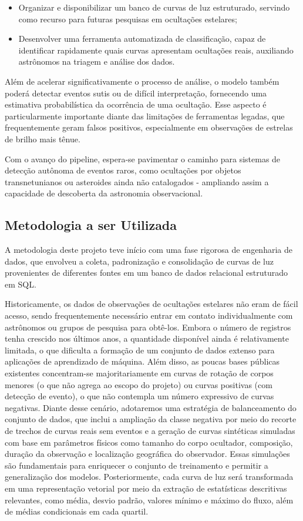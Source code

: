 \documentclass[12pt]{article}
\numberwithin{equation}{section}
\begin{document}
\begin{itemize}
    \item Organizar e disponibilizar um banco de curvas de luz estruturado, servindo como recurso para futuras pesquisas em ocultações estelares;
    \item Desenvolver uma ferramenta automatizada de classificação, capaz de identificar rapidamente quais curvas apresentam ocultações reais, auxiliando astrônomos na triagem e análise dos dados.
\end{itemize}

Além de acelerar significativamente o processo de análise, o modelo também poderá detectar eventos sutis ou de difícil interpretação, fornecendo uma estimativa probabilística da ocorrência de uma ocultação. Esse aspecto é particularmente importante diante das limitações de ferramentas legadas, que frequentemente geram falsos positivos, especialmente em observações de estrelas de brilho mais tênue.

Com o avanço do pipeline, espera-se pavimentar o caminho para sistemas de detecção autônoma de eventos raros, como ocultações por objetos transnetunianos ou asteroides ainda não catalogados - ampliando assim a capacidade de descoberta da astronomia observacional.

\subsection{Metodologia a ser Utilizada}
\indent
A metodologia deste projeto teve início com uma fase rigorosa de engenharia de dados, que envolveu a coleta, padronização e consolidação de curvas de luz provenientes de diferentes fontes em um banco de dados relacional estruturado em SQL. 

Historicamente, os dados de observações de ocultações estelares não eram de fácil acesso, sendo frequentemente necessário entrar em contato individualmente com astrônomos ou grupos de pesquisa para obtê-los. Embora o número de registros tenha crescido nos últimos anos, a quantidade disponível ainda é relativamente limitada, o que dificulta a formação de um conjunto de dados extenso para aplicações de aprendizado de máquina. Além disso, as poucas bases públicas existentes concentram-se majoritariamente em curvas de rotação de corpos menores (o que não agrega ao escopo do projeto) ou curvas positivas (com detecção de evento), o que não contempla um número expressivo de curvas negativas. Diante desse cenário, adotaremos uma estratégia de balanceamento do conjunto de dados, que inclui a ampliação da classe negativa por meio do recorte de trechos de curvas reais sem eventos e a geração de curvas sintéticas simuladas com base em parâmetros físicos como tamanho do corpo ocultador, composição, duração da observação e localização geográfica do observador. Essas simulações são fundamentais para enriquecer o conjunto de treinamento e permitir a generalização dos modelos. Posteriormente, cada curva de luz será transformada em uma representação vetorial por meio da extração de estatísticas descritivas relevantes, como média, desvio padrão, valores mínimo e máximo do fluxo, além de médias condicionais em cada quartil.
\end{document}
